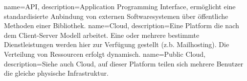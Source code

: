 {
  name=API,
  description={Application Programming Interface, ermöglicht eine
               standardisierte Anbindung von externen Softwaresystemen über
               öffentliche Methoden einer Bibliothek.\cite{HowDoAPIsEvolve}}
}
{
  name=Cloud,
  description={Eine Platform die nach dem Client-Server Modell arbeitet. Eine
               oder mehrere bestimmte Dienstleistungen werden hier zur
               Verfügung gestellt (z.b. Mailhosting). Die Verteilung von
               Ressourcen erfolgt dynamisch.}
}
{
  name=Public Cloud,
  description={Siehe auch \gls{Cloud}, auf dieser Platform teilen sich mehrere
               Benutzer die gleiche physische Infrastruktur.}
}
